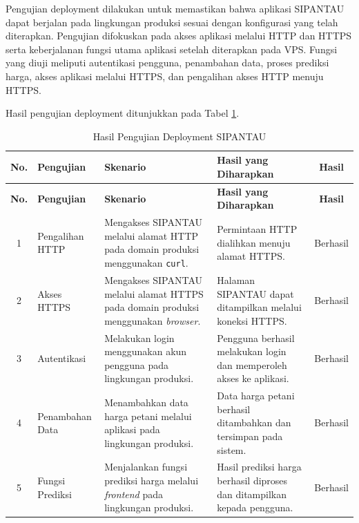 Pengujian deployment dilakukan untuk memastikan bahwa aplikasi SIPANTAU dapat berjalan pada lingkungan produksi sesuai dengan konfigurasi yang telah diterapkan. Pengujian difokuskan pada akses aplikasi melalui HTTP dan HTTPS serta keberjalanan fungsi utama aplikasi setelah diterapkan pada VPS. Fungsi yang diuji meliputi autentikasi pengguna, penambahan data, proses prediksi harga, akses aplikasi melalui HTTPS, dan pengalihan akses HTTP menuju HTTPS.

Hasil pengujian deployment ditunjukkan pada Tabel \ref{tab:pengujian-deployment}.

\begin{longtable}{|c|p{2.5cm}|p{3.2cm}|p{3.2cm}|c|}
\caption{Hasil Pengujian Deployment SIPANTAU}
\label{tab:pengujian-deployment} \\
\hline
\textbf{No.} & \textbf{Pengujian} & \textbf{Skenario} & \textbf{Hasil yang Diharapkan} & \textbf{Hasil} \\
\hline
\endfirsthead

\hline
\textbf{No.} & \textbf{Pengujian} & \textbf{Skenario} & \textbf{Hasil yang Diharapkan} & \textbf{Hasil} \\
\hline
\endhead

1 &
Pengalihan HTTP &
Mengakses SIPANTAU melalui alamat HTTP pada domain produksi menggunakan \texttt{curl}. &
Permintaan HTTP dialihkan menuju alamat HTTPS. &
Berhasil \\ \hline

2 &
Akses HTTPS &
Mengakses SIPANTAU melalui alamat HTTPS pada domain produksi menggunakan \textit{browser}. &
Halaman SIPANTAU dapat ditampilkan melalui koneksi HTTPS. &
Berhasil \\ \hline

3 &
Autentikasi &
Melakukan login menggunakan akun pengguna pada lingkungan produksi. &
Pengguna berhasil melakukan login dan memperoleh akses ke aplikasi. &
Berhasil \\ \hline

4 &
Penambahan Data &
Menambahkan data harga petani melalui aplikasi pada lingkungan produksi. &
Data harga petani berhasil ditambahkan dan tersimpan pada sistem. &
Berhasil \\ \hline

5 &
Fungsi Prediksi &
Menjalankan fungsi prediksi harga melalui \textit{frontend} pada lingkungan produksi. &
Hasil prediksi harga berhasil diproses dan ditampilkan kepada pengguna. &
Berhasil \\ \hline

\end{longtable}

